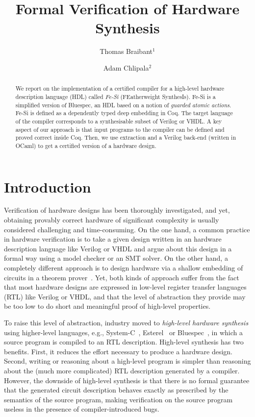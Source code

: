 \documentclass{llncs}
\author{Thomas Braibant$^1$ \and Adam Chlipala${}^{2}$}
\institute{${}^1$ Inria \qquad ${}^2$ MIT} %
\title{Formal Verification of Hardware Synthesis}
\begin{document}
\maketitle

\begin{abstract}
  We report on the implementation of a certified compiler for a
  high-level hardware description language (HDL) called \emph{Fe-Si}
  (FEatherweight SynthesIs).
  Fe-Si is a simplified version of Bluespec, an HDL based on a notion
  of \emph{guarded atomic actions}. Fe-Si is defined as a
  dependently typed deep embedding in Coq. The target language of the
  compiler corresponds to a synthesisable subset of Verilog or VHDL.
  A key aspect of our approach is that input programs to the compiler
  can be defined and proved correct inside Coq. Then, we use
  extraction and a Verilog back-end (written in OCaml) to get a
  certified version of a hardware design.
\end{abstract}

\section*{Introduction}
Verification of hardware designs has been thoroughly investigated, and
yet, obtaining provably correct hardware of significant complexity is
usually considered challenging and time-consuming. 
%
On the one hand, a common practice in hardware verification is to take
a given design written in an hardware description language like
Verilog or VHDL and argue about this design in a formal way using a
model checker or an SMT solver.
%
On the other hand, a completely different approach is to design
hardware via a shallow embedding of circuits in a theorem
prover~\cite{hanna-veritas,UCAM-CL-TR-77,hunt89,vamp,certifying-circuits-in-type-theory}.
%
Yet, both kinds of approach suffer from the fact that most hardware
designs are expressed in low-level register transfer languages (RTL)
like Verilog or VHDL, and that the level of abstraction they provide
may be too low to do short and meaningful proof of high-level
properties.

\medskip

To raise this level of abstraction, industry moved to \emph{high-level
  hardware synthesis} using higher-level languages, e.g.,
System-C~\cite{systemc}, Esterel~\cite{DBLP:conf/birthday/Berry00} or
Bluespec~\cite{bluespec}, in which a source program is
compiled to an RTL description.
%
High-level synthesis has two benefits. 
%
First, it reduces the effort necessary to produce a hardware design.
%
Second, writing or reasoning about a high-level program is simpler
than reasoning about the (much more complicated) RTL description
generated by a compiler.
%
However, the downside of high-level synthesis is that there is no
formal guarantee that the generated circuit description behaves
exactly as prescribed by the semantics of the source
program, making verification on the source program useless in the
presence of compiler-introduced bugs.
%
\end{document}
